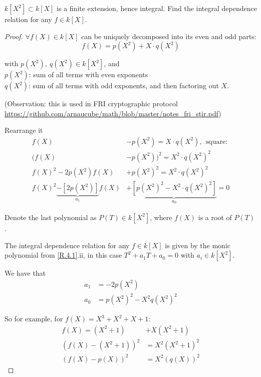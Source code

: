 \documentclass{article}
\theoremstyle{definition}
\newenvironment{ex}[1]
{\renewcommand\theinnerex{#1}\innerex}
{\endinnerex}
\begin{document}
\begin{ex}{R.4.1.a}
  $k[X^2] \subset k[X]$ is a finite extension, hence integral. Find the integral dependence relation for any $f \in k[X]$.
\end{ex}
\begin{proof}
  $\forall f(X) \in k[X]$ can be uniquely decomposed into its even and odd parts:
  $$f(X) = p(X^2) + X \cdot q(X^2)$$

  with $p(X^2),~ q(X^2) \in k[X^2]$, and\\
  $p(X^2)$: sum of all terms with even exponents\\
  $q(X^2)$: sum of all terms with odd exponents, and then factoring out $X$.

  \vspace{0.3cm}
  (Observation: this is used in FRI cryptographic protocol\\
  \href{https://github.com/arnaucube/math/blob/master/notes_fri_stir.pdf}{https://github.com/arnaucube/math/blob/master/notes\_fri\_stir.pdf})


  Rearrange it
  \begin{align*}
    f(X) &- p(X^2) = X \cdot q(X^2), ~~\text{square:}\\
    (f(X) &- p(X^2))^2 = X^2 \cdot q(X^2)^2\\
    f(X)^2-2 p(X^2) f(X) &+ p(X^2)^2 = X^2 \cdot q(X^2)^2\\
    f(X)^2 \underbrace{-[2 p(X^2)]}_{a_1} f(X) &+ \underbrace{[p(X^2)^2 - X^2 \cdot q(X^2)^2]}_{a_0} = 0
  \end{align*}

   Denote the last polynomial as $P(T) \in k[X^2]$, where $f(X)$ is a root of $P(T)$.

   \vspace{0.2cm}
   The integral dependence relation for any $f \in k[X]$ is given by the monic polynomial from \ref{R.4.1}.ii, in this case $T^2 + a_1 T + a_0 = 0$ with $a_i \in k[X^2]$.

   We have that
   \begin{align*}
     a_1 &= -2 p(X^2)\\
     a_0 &= p(X^2)^2 - X^2 q(X^2)^2
   \end{align*}


   So for example, for $f(X)= X^3 + X^2 + X + 1$:
   \begin{align*}
     f(X) = (X^2 + 1) &+ X (X^2 + 1)\\
     (f(X) - (X^2+1))^2 &= X^2 (X^2 + 1)^2\\
     (f(X) - p(X))^2 &= X^2 (q(X))^2
   \end{align*}
\end{proof}
\end{document}
